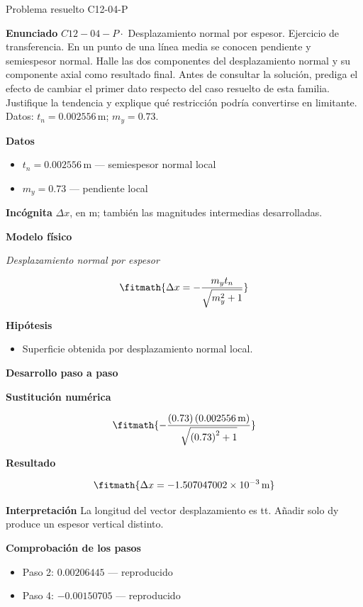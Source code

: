 \documentclass[10pt,openany]{book}
\begin{document}
\begin{studiumworked}{Problema resuelto C12-04-P}


\noindent\textbf{Enunciado}
\(C12-04-P \cdot\) Desplazamiento normal por espesor. Ejercicio de transferencia. En un punto de una línea media se conocen pendiente y semiespesor normal. Halle las dos componentes del desplazamiento normal y su componente axial como resultado final. Antes de consultar la solución, prediga el efecto de cambiar el primer dato respecto del caso resuelto de esta familia. Justifique la tendencia y explique qué restricción podría convertirse en limitante. Datos: \(t_n=0.002556\, \mathrm{m}\); \(m_y=0.73\).

\noindent\textbf{Datos}
\begin{itemize}
\item $t_n = 0.002556\,\mathrm{m}$ — semiespesor normal local
\item $m_y = 0.73$ — pendiente local
\end{itemize}

\noindent\textbf{Incógnita}
$\Delta x$, en $\mathrm{m}$; también las magnitudes intermedias desarrolladas.

\noindent\textbf{Modelo físico}

\noindent\textit{Desplazamiento normal por espesor}

\[
\fitmath{\Delta x=- \frac{m_y t_n}{\sqrt{m_y^{2} + 1}}}
\]

\noindent\textbf{Hipótesis}
\begin{itemize}
\item Superficie obtenida por desplazamiento normal local.
\end{itemize}

\noindent\textbf{Desarrollo paso a paso}



\noindent\textbf{Sustitución numérica}

\[
\fitmath{- \frac{\left(0.73\right) \left(0.002556\,\mathrm{m}\right)}{\sqrt{\left(0.73\right)^{2} + 1}}}
\]

\noindent\textbf{Resultado}

\[
\fitmath{\Delta x=-1.507047002\times10^{-3}\,\mathrm{m}}
\]

\noindent\textbf{Interpretación}
La longitud del vector desplazamiento es tt. Añadir solo dy produce un espesor vertical distinto.

\noindent\textbf{Comprobación de los pasos}
\begin{itemize}
\item Paso 2: $0.00206445$ — reproducido
\item Paso 4: $-0.00150705$ — reproducido
\end{itemize}


\end{studiumworked}
\end{document}
